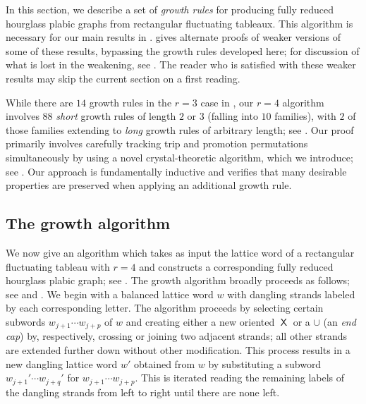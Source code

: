 \documentclass{amsart}
\theoremstyle{definition}
\theoremstyle{remark}
\numberwithin{equation}{section}
\DeclareMathOperator{\sfX}{\mathsf{X}}
\begin{document}
In this section, we describe a set of \emph{growth rules} for producing fully reduced hourglass plabic graphs from rectangular fluctuating tableaux. This algorithm is necessary for our main results in .  gives alternate proofs of weaker versions of some of these results, bypassing the growth rules developed here; for discussion of what is lost in the weakening, see . The reader who is satisfied with these weaker results may skip the current section on a first reading.

While there are $14$ growth rules in the $r=3$ case in \cite{Khovanov-Kuperberg}, our $r=4$ algorithm involves $88$ \emph{short} growth rules of length $2$ or $3$ (falling into $10$ families), with $2$ of those families extending to \emph{long} growth rules of arbitrary length; see . Our proof primarily involves carefully tracking trip and promotion permutations simultaneously by using a novel crystal-theoretic algorithm, which we introduce; see . Our approach is fundamentally inductive and verifies that many desirable properties are preserved when applying an additional growth rule.

\subsection{The growth algorithm}
We now give an algorithm which takes as input the lattice word of a rectangular fluctuating tableau with $r=4$ and constructs a corresponding fully reduced hourglass plabic graph; see . The growth algorithm broadly proceeds as follows; see  and . We begin with a balanced lattice word $w$ with dangling strands labeled by each corresponding letter. The algorithm proceeds by selecting certain subwords $w_{j+1} \cdots w_{j+p}$ of $w$ and creating either a new oriented $\sfX$ or a $\cup$ (an \emph{end cap}) by, respectively, crossing or joining two adjacent strands; all other strands are extended further down without other modification. This process results in a new dangling lattice word $w'$ obtained from $w$ by substituting a subword $w_{j+1}' \cdots w_{j+q}'$ for $w_{j+1} \cdots w_{j+p}$. This is iterated reading the remaining labels of the dangling strands from left to right until there are none left.
\end{document}
